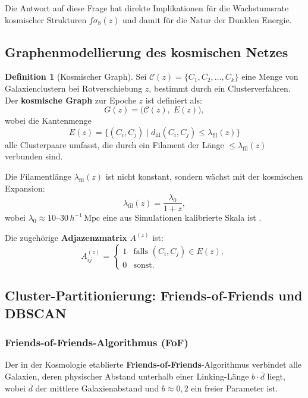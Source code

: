 ﻿\documentclass[a4paper,12pt]{article}
\theoremstyle{definition}
\newtheorem{definition}{Definition}[section]
\theoremstyle{remark}
\begin{document}
Die Antwort auf diese Frage hat direkte Implikationen für die Wachstumsrate
kosmischer Strukturen $f\sigma_8(z)$ und damit für die Natur der
Dunklen Energie.

\subsection{Graphenmodellierung des kosmischen Netzes}

\begin{definition}[Kosmischer Graph]
  Sei $\mathcal{C}(z) = \{C_1, C_2, \ldots, C_k\}$ eine Menge von
  Galaxienclustern bei Rotverschiebung $z$, bestimmt durch ein
  Clusterverfahren. Der \textbf{kosmische Graph} zur Epoche $z$ ist definiert als:
  \[
    G(z) = \bigl(\mathcal{C}(z),\; E(z)\bigr),
  \]
  wobei die Kantenmenge
  \[
    E(z) = \bigl\{(C_i, C_j) \mid d_\mathrm{fil}(C_i, C_j) \leq \lambda_\mathrm{fil}(z)\bigr\}
  \]
  alle Clusterpaare umfasst, die durch ein Filament der Länge
  $\leq \lambda_\mathrm{fil}(z)$ verbunden sind.
\end{definition}

Die Filamentlänge $\lambda_\mathrm{fil}(z)$ ist nicht konstant, sondern
wächst mit der kosmischen Expansion:
\begin{equation}
  \lambda_\mathrm{fil}(z) = \frac{\lambda_0}{1+z},
\end{equation}
wobei $\lambda_0 \approx 10$--$30\,h^{-1}\,\mathrm{Mpc}$ eine aus Simulationen
kalibrierte Skala ist \cite{dodelson2003}.

Die zugehörige \textbf{Adjazenzmatrix} $A^{(z)}$ ist:
\begin{equation}
  \label{eq:adj_cosmic}
  A^{(z)}_{ij} =
  \begin{cases}
    1 & \text{falls } (C_i, C_j) \in E(z), \\
    0 & \text{sonst.}
  \end{cases}
\end{equation}

\subsection{Cluster-Partitionierung: Friends-of-Friends und DBSCAN}

\subsubsection*{Friends-of-Friends-Algorithmus (FoF)}

Der in der Kosmologie etablierte \textbf{Friends-of-Friends}-Algorithmus
\cite{weinberg2013} verbindet alle Galaxien, deren physischer Abstand unterhalb
einer Linking-Länge $b \cdot \bar{d}$ liegt, wobei $\bar{d}$ der mittlere
Galaxienabstand und $b \approx 0{,}2$ ein freier Parameter ist.
\end{document}
